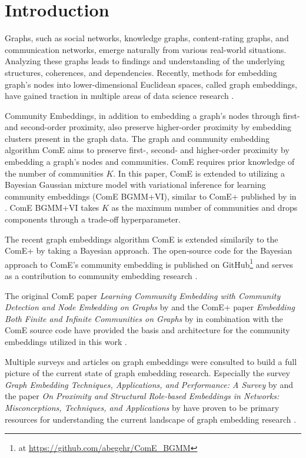 \documentclass[conference]{IEEEtran}
\begin{document}
\section{Introduction}

Graphs, such as social networks, knowledge graphs, content-rating graphs, and communication networks, emerge naturally from various real-world situations. Analyzing these graphs leads to findings and understanding of the underlying structures, coherences, and dependencies. Recently, methods for embedding graph's nodes into lower-dimensional Euclidean spaces, called graph embeddings, have gained traction in multiple areas of data science research \cite{Goyal_2018}.

Community Embeddings, in addition to embedding a graph's nodes through first- and second-order proximity, also preserve higher-order proximity by embedding clusters present in the graph data. The graph and community embedding algorithm ComE aims to preserve first-, second- and higher-order proximity by embedding a graph's nodes and communities\cite{ComE}. ComE requires prior knowledge of the number of communities $K$. In this paper, ComE is extended to utilizing a Bayesian Gaussian mixture model with variational inference for learning community embeddings (ComE BGMM+VI), similar to ComE+ published by \citeauthor{ComE+} in \citeyear{ComE+} \cite{ComE+}. ComE BGMM+VI takes $K$ as the maximum number of communities and drops components through a trade-off hyperparameter.

The recent \citeyear{ComE} graph embeddings algorithm ComE is extended similarily to the \citeyear{ComE+} ComE+ by taking a Bayesian approach. The open-source code for the Bayesian approach to ComE's community embedding is published on GitHub\footnote{at \url{https://github.com/abegehr/ComE_BGMM}} and serves as a contribution to community embedding research \cite{ComE_BGMM_GH}.

The original ComE paper \textit{Learning Community Embedding with Community Detection and Node Embedding on Graphs} by \citeauthor{ComE} and the ComE+ paper \textit{Embedding Both Finite and Infinite Communities on Graphs} by \citeauthor{ComE+} in combination with the ComE source code have provided the basis and architecture for the community embeddings utilized in this work \cite{ComE, ComE+, ComE_GH}.

Multiple surveys and articles on graph embeddings were consulted to build a full picture of the current state of graph embedding research. Especially the \citeyear{Goyal_2018} survey \textit{Graph Embedding Techniques, Applications, and Performance: A Survey} by \citeauthor{Goyal_2018} and the \citeyear{rossi20tkdd-roles} paper \textit{On Proximity and Structural Role-based Embeddings in Networks: Misconceptions, Techniques, and Applications} by \citeauthor{rossi20tkdd-roles} have proven to be primary resources for understanding the current landscape of graph embedding research \cite{Goyal_2018, rossi20tkdd-roles}.
\end{document}
